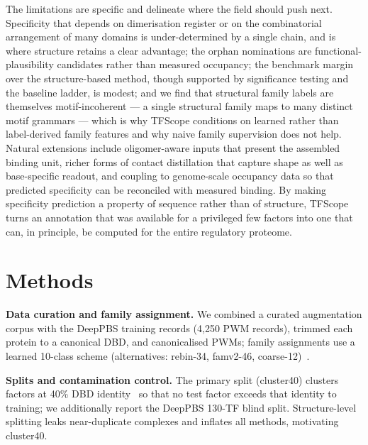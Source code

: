 \documentclass[11pt,letterpaper]{article}
\begin{document}
The limitations are specific and delineate where the field should push next. Specificity that
depends on dimerisation register or on the combinatorial arrangement of many domains is
under-determined by a single chain, and is where structure retains a clear advantage; the orphan
nominations are functional-plausibility candidates rather than measured occupancy; the benchmark
margin over the structure-based method, though supported by significance testing and the baseline
ladder, is modest; and we find that structural family labels are themselves motif-incoherent --- a
single structural family maps to many distinct motif grammars --- which is why TFScope conditions on
learned rather than label-derived family features and why naive family supervision does not help.
Natural extensions include oligomer-aware inputs that present the assembled binding unit, richer
forms of contact distillation that capture shape as well as base-specific readout, and coupling to
genome-scale occupancy data so that predicted specificity can be reconciled with measured binding.
By making specificity prediction a property of sequence rather than of structure, TFScope turns an
annotation that was available for a privileged few factors into one that can, in principle, be
computed for the entire regulatory proteome.

\section*{Methods}

\noindent\textbf{Data curation and family assignment.} We combined a curated augmentation corpus
with the DeepPBS training records (4{,}250 PWM records), trimmed each protein to a canonical DBD,
and canonicalised PWMs; family assignments use a learned 10-class scheme (alternatives: rebin-34,
famv2-46, coarse-12)~\cite{Weirauch2014,CastroMondragon2022,Fornes2020}.

\noindent\textbf{Splits and contamination control.} The primary split (cluster40) clusters factors
at 40\% DBD identity~\cite{LiGodzik2006} so that no test factor exceeds that identity to training;
we additionally report the DeepPBS 130-TF blind split. Structure-level splitting leaks
near-duplicate complexes and inflates all methods, motivating cluster40.
\end{document}
